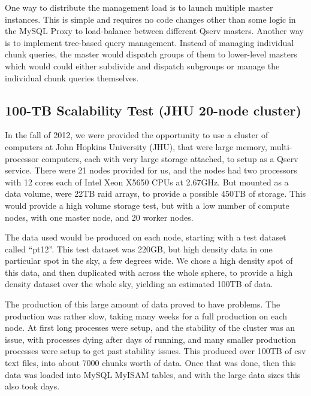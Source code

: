 \documentclass[DM,lsstdraft,toc]{lsstdoc}
\begin{document}
One way to distribute the management load is to launch multiple master
instances. This is simple and requires no code changes other than some
logic in the MySQL Proxy to load-balance between different Qserv
masters. Another way is to implement tree-based query management.
Instead of managing individual chunk queries, the master would dispatch
groups of them to lower-level masters which would could either subdivide
and dispatch subgroups or manage the individual chunk queries
themselves.

\subsection{100-TB Scalability Test (JHU 20-node
cluster)}\label{tb-scalability-test-jhu-20-node-cluster}

In the fall of 2012, we were provided the opportunity to use a cluster
of computers at John Hopkins University (JHU), that were large memory,
multi-processor computers, each with very large storage attached, to
setup as a Qserv service. There were 21 nodes provided for us, and the
nodes had two processors with 12 cores each of Intel Xeon X5650 CPUs at
2.67GHz. But mounted as a data volume, were 22TB raid arrays, to provide
a possible 450TB of storage. This would provide a high volume storage
test, but with a low number of compute nodes, with one master node, and
20 worker nodes.

The data used would be produced on each node, starting with a test
dataset called ``pt12''. This test dataset was 220GB, but high density
data in one particular spot in the sky, a few degrees wide. We chose a
high density spot of this data, and then duplicated with across the
whole sphere, to provide a high density dataset over the whole sky,
yielding an estimated 100TB of data.

The production of this large amount of data proved to have problems. The
production was rather slow, taking many weeks for a full production on
each node. At first long processes were setup, and the stability of the
cluster was an issue, with processes dying after days of running, and
many smaller production processes were setup to get past stability
issues. This produced over 100TB of csv text files, into about 7000
chunks worth of data. Once that was done, then this data was loaded into
MySQL MyISAM tables, and with the large data sizes this also took days.
\end{document}
